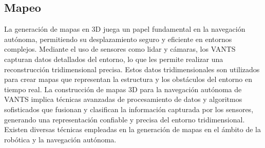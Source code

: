\documentclass[sigconf]{acmart}
\begin{document}
\subsection*{Mapeo}

La generación de mapas en 3D juega un papel fundamental en la navegación autónoma, permitiendo su desplazamiento seguro y eficiente en entornos complejos. Mediante el uso de sensores como lidar y cámaras, los VANTS capturan datos detallados del entorno, lo que les permite realizar una reconstrucción tridimensional precisa. Estos datos tridimensionales son utilizados para crear mapas que representan la estructura y los obstáculos del entorno en tiempo real. La construcción de mapas 3D para la navegación autónoma de VANTS implica técnicas avanzadas de procesamiento de datos y algoritmos sofisticados que fusionan y clasifican la información capturada por los sensores, generando una representación confiable y precisa del entorno tridimensional. Existen diversas técnicas empleadas en la generación de mapas en el ámbito de la robótica y la navegación autónoma.
\end{document}
